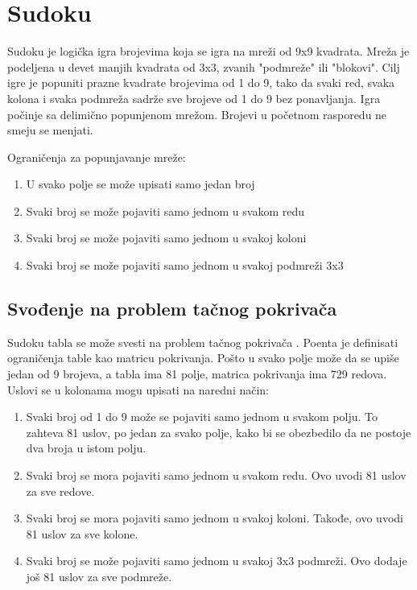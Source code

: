 \documentclass[a4paper]{article}
\begin{document}
{\section{Sudoku}

Sudoku je logička igra brojevima koja se igra na mreži od 9x9 kvadrata. Mreža je podeljena u devet manjih kvadrata od 3x3,
zvanih "podmreže" ili "blokovi". Cilj igre je popuniti prazne kvadrate brojevima od 1 do 9, tako da svaki red, svaka kolona i
svaka podmreža sadrže sve brojeve od 1 do 9 bez ponavljanja. Igra počinje sa delimično popunjenom mrežom. Brojevi u početnom
rasporedu ne smeju se menjati.

Ograničenja za popunjavanje mreže:
\begin{enumerate}
  \item U svako polje se može upisati samo jedan broj
  \item Svaki broj se može pojaviti samo jednom u svakom redu
  \item Svaki broj se može pojaviti samo jednom u svakoj koloni
  \item Svaki broj se može pojaviti samo jednom u svakoj podmreži 3x3
\end{enumerate}

\subsection{Svođenje na problem tačnog pokrivača}

Sudoku tabla se može svesti na problem tačnog pokrivača \cite{sudoku}. Poenta je definisati ograničenja table kao
matricu pokrivanja. Pošto u svako polje može da se upiše jedan od 9 brojeva, a tabla ima 81 polje, matrica pokrivanja
ima 729 redova. Uslovi se u kolonama mogu upisati na naredni način:
\begin{enumerate}
  \item Svaki broj od 1 do 9 može se pojaviti samo jednom u svakom polju. To zahteva 81 uslov, po jedan za svako polje, kako bi se obezbedilo da ne postoje dva broja u istom polju.
  \item Svaki broj se mora pojaviti samo jednom u svakom redu. Ovo uvodi 81 uslov za sve redove.
  \item Svaki broj se mora pojaviti samo jednom u svakoj koloni. Takođe, ovo uvodi 81 uslov za sve kolone.
  \item Svaki broj se može pojaviti samo jednom u svakoj 3x3 podmreži. Ovo dodaje još 81 uslov za sve podmreže.
\end{enumerate}

}
\end{document}
